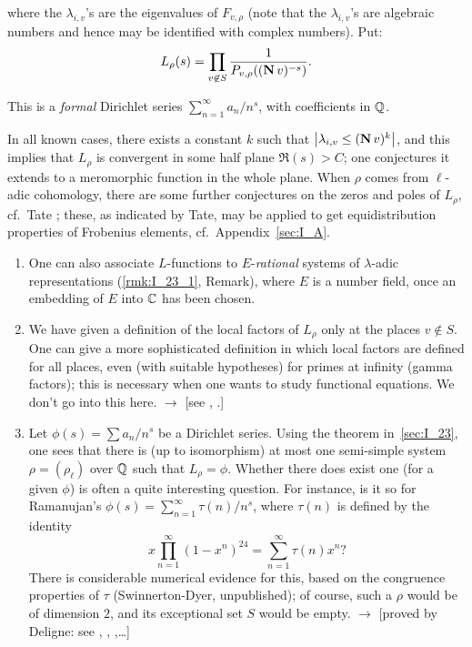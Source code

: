 where the $\lambda_{i,v}$'s are the eigenvalues of $F_{v,\rho}$ (note that the 
$\lambda_{i,v}$'s are algebraic numbers and hence may be identified with 
complex numbers). Put:
\[
L_\rho(s) = \prod_{v \not\in S} \frac{1}{P_{v,\rho}((\operatorname{\mathbf{N}} v)^{-s})}.
\]

This is a \emph{formal} Dirichlet series $\sum_{n=1}^{\infty} a_n / n^s$, with 
coefficients in $\mathbb{Q}$.

In all known cases, there exists a constant $k$ such that $\left|{\lambda_{i,v} 
\leq (\operatorname{\mathbf{N}} v)^k}\right|$, and this implies that $L_\rho$ is convergent in 
some half plane $\Re(s) > C$; one conjectures it extends to a meromorphic 
function in the whole plane.
\dpage
When $\rho$ comes from $\ell$-adic cohomology, 
there are some further conjectures on the zeros and poles of $L_\rho$, cf.\ Tate 
\cite{36}; these, as indicated by Tate, may be applied to get equidistribution 
properties of Frobenius elements, cf.\ Appendix~\ref{sec:I_A}.

\begin{obs}
\begin{enumerate}
	\item\label{rmk:I_24_1} One can also associate $L$-functions to $E$-\emph{rational} systems of $\lambda$-adic representations (\ref{rmk:I_23_1}, Remark), where $E$ is a number field, once an embedding of $E$ into $\mathbb{C}$ has been chosen.
	\item We have given a definition of the local factors of $L_\rho$ only at 
	the places $v \not\in S$. One can give a more sophisticated definition in 
	which local factors are defined for all places, even (with suitable 
	hypotheses) for primes at infinity (gamma factors); this is necessary when 
	one wants to study functional equations. We don't go into this here. 
	$\rightarrow$ [see \cite{51}, \cite{74}.]
	
	\item Let $\phi(s) = \sum a_n / n^s $ be a Dirichlet series. Using the 
	theorem in~\ref{sec:I_23}, one sees that there is (up to isomorphism) at 
	most one semi-simple system $\rho = (\rho_\ell)$ over $\mathbb{Q}$ such that 
	$L_\rho = \phi$. Whether there does exist one (for a given $\phi$) is often a quite interesting question. For instance, is it so for Ramanujan's $\phi(s) = \sum_{n = 1}^{\infty} \tau(n)/n^s$, where $\tau(n)$ is defined by the identity
	\[
	x \prod_{n=1}^{\infty}(1 - x^n)^24 = \sum_{n=1}^{\infty}\tau(n)x^n ?
	\]
	There is considerable numerical evidence for this, based on the congruence 
	properties of $\tau$ (Swinnerton-Dyer, unpublished); of course,
	such a $\rho$ would be of dimension $2$, and its exceptional set $S$ would be empty. $\rightarrow$ [proved by Deligne: see \cite{49}, \cite{50}, \cite{65},\dots]
\end{enumerate}
\end{obs}

